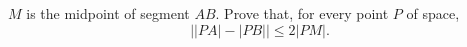 $M$ is the midpoint of segment $AB$. Prove that, for every point $P$ of space,
\[ \big||PA| - |PB|\big| \leq 2|PM|. \]
